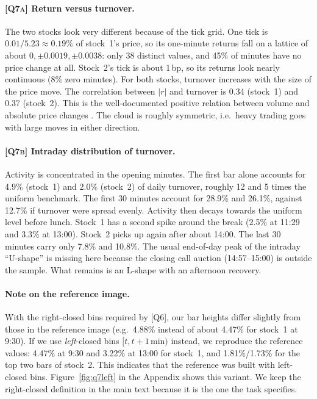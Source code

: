 \documentclass[11pt,a4paper]{article}
\newcommand{\Q}[1]{\textsc{[Q#1]}}
\begin{document}
\paragraph{\Q{7a} Return versus turnover.} The two stocks look very different because of the tick
grid. One tick is $0.01/5.23\approx0.19\%$ of stock~1's price, so its one-minute returns fall on a
lattice of about $0,\pm0.0019,\pm0.0038$: only 38 distinct values, and 45\% of minutes have no price
change at all. Stock~2's tick is about 1\,bp, so its returns look nearly continuous (8\% zero
minutes). For both stocks, turnover increases with the size of the price move. The correlation
between $|r|$ and turnover is 0.34 (stock~1) and 0.37 (stock~2). This is the well-documented
positive relation between volume and absolute price changes \citep{karpoff1987,jain1988}. The
cloud is roughly symmetric, i.e.\ heavy trading goes with large moves in either direction.

\paragraph{\Q{7b} Intraday distribution of turnover.} Activity is concentrated in the opening
minutes. The first bar alone accounts for 4.9\% (stock~1) and 2.0\% (stock~2) of daily turnover,
roughly 12 and 5 times the uniform benchmark. The first 30 minutes account for 28.9\% and 26.1\%,
against 12.7\% if turnover were spread evenly. Activity then decays towards the uniform level
before lunch. Stock~1 has a second spike around the break (2.5\% at 11:29 and 3.3\% at 13:00). Stock~2
picks up again after about 14:00. The last 30 minutes carry only 7.8\% and 10.8\%. The usual
end-of-day peak of the intraday ``U-shape'' \citep{wood1985,jain1988,admati1988} is missing here because the
closing call auction (14:57--15:00) is outside the sample. What remains is an L-shape with an
afternoon recovery.

\paragraph{Note on the reference image.} With the right-closed bins required by \Q{6}, our bar
heights differ slightly from those in the reference image (e.g.\ 4.88\% instead of about 4.47\% for
stock~1 at 9:30). If we use \emph{left}-closed bins $[t, t+1\,\text{min})$ instead, we reproduce
the reference values: 4.47\% at 9:30 and 3.22\% at 13:00 for stock~1, and 1.81\%/1.73\% for the top
two bars of stock~2. This indicates that the reference was built with left-closed bins.
Figure~\ref{fig:q7left} in the Appendix shows this variant. We keep the right-closed definition in
the main text because it is the one the task specifies.
\end{document}
